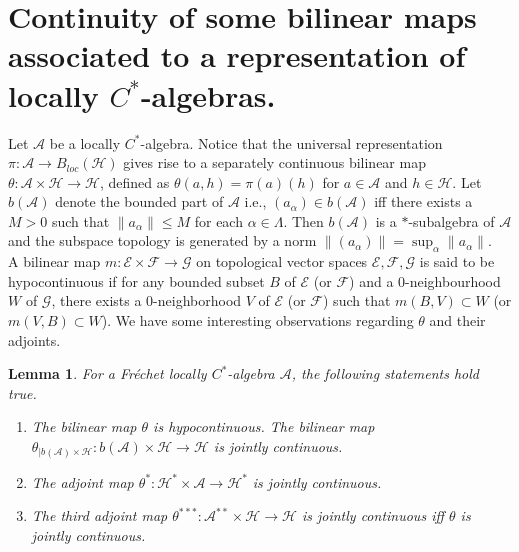 \documentclass[10pt]{article}
\newtheorem{lemma}[theorem]{Lemma}
\theoremstyle{definition}
\begin{document}
	\section{Continuity of some bilinear maps associated to a representation of locally $C^*$-algebras.}	
Let $\mathcal A$ be a locally $C^*$-algebra. Notice that the universal representation $\pi:\mathcal A\to B_{loc}(\mathcal H)$ gives rise to a separately continuous bilinear map $\theta:\mathcal A\times\mathcal H\to\mathcal H$, defined as $\theta(a,h)=\pi(a)(h)$ for $a\in \mathcal A$ and $h\in \mathcal H$. Let $b(\mathcal A)$ denote the bounded part of $\mathcal A$ i.e., $(a_\alpha)\in b(\mathcal A)$ iff there exists a $M>0$ such that $\|a_\alpha\|\leq M$ for each $\alpha\in \Lambda$. Then $b(\mathcal A)$ is a $*$-subalgebra of $\mathcal A$ and the subspace topology is generated by a norm $\|(a_\alpha)\|=\sup_\alpha\|a_\alpha\|$.\\

A bilinear map $m:\mathcal E\times \mathcal F\to \mathcal G$ on topological vector spaces $\mathcal E,\mathcal F, \mathcal G$ is said to be hypocontinuous if for any bounded subset $B$ of $\mathcal E$ (or $\mathcal F$) and a $0$-neighbourhood $W$ of $\mathcal G$, there exists a $0$-neighborhood $V$ of $\mathcal E$ (or $\mathcal F$) such that $m(B,V)\subset W$ (or $m(V,B)\subset W$). We have some interesting observations regarding $\theta$ and their adjoints. 
	\begin{lemma}\label{bilnet}
		For a Fr\'echet locally $C^*$-algebra $\mathcal A$, the following statements hold true.
		\begin{enumerate}
			\item  The bilinear map $\theta$ is hypocontinuous.	The bilinear map $\theta_{|b(\mathcal A)\times \mathcal H}:b(\mathcal A)\times \mathcal H\to \mathcal H$ is jointly continuous.
			\item The adjoint map $\theta^*:\mathcal H^*\times \mathcal A\to \mathcal H^*$ is jointly continuous.
			\item The third adjoint map	$\theta^{***}:\mathcal A^{**}\times \mathcal H\to\mathcal H$ is jointly continuous iff $\theta$ is jointly continuous. 
			
		\end{enumerate}
	\end{lemma}
	
\end{document}
